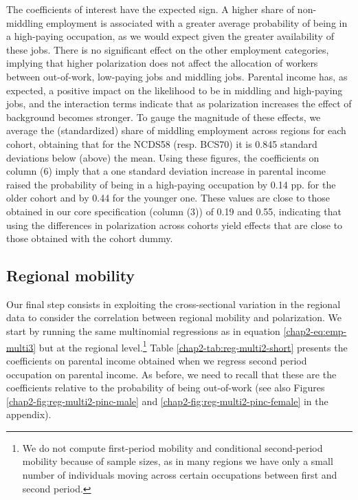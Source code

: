 The coefficients of interest have the expected sign. A higher share of non-middling employment is associated with a greater average probability of being in a high-paying occupation, as we would expect given the greater availability of these jobs. There is no significant effect on the other employment categories, implying that higher polarization does not affect the allocation of workers between out-of-work, low-paying jobs and middling jobs. Parental income has, as expected, a positive impact on the likelihood to be in middling and high-paying jobs, and the interaction terms indicate that as polarization increases the effect of background becomes stronger. To gauge the magnitude of these effects, we average the (standardized) share of middling employment across regions for each cohort, obtaining that for the NCDS58 (resp. BCS70) it is 0.845 standard deviations below (above) the mean. Using these figures, the coefficients on column (6) imply that a one standard deviation increase in parental income raised the probability of being in a high-paying occupation by 0.14 pp. for the older cohort and by 0.44 for the younger one. These values are close to those obtained in our core specification (column (3)) of 0.19 and 0.55, indicating that using the differences in polarization across cohorts yield effects that are close to those obtained with the cohort dummy. 


\subsection{Regional mobility} 

Our final step consists in exploiting the cross-sectional variation in the regional data to consider the correlation between regional mobility and polarization. We start by running the same multinomial regressions as in equation \ref{chap2-eq:emp-multi3} but at the regional level.\footnote{We do not compute first-period mobility and conditional second-period mobility because of sample sizes, as in many regions we have only a small number of individuals moving across certain occupations between first and second period.} Table \ref{chap2-tab:reg-multi2-short} presents the coefficients on parental income obtained when we regress second period occupation on parental income. As before, we need to recall that these are the coefficients relative to the probability of being out-of-work (see also Figures \ref{chap2-fig:reg-multi2-pinc-male} and \ref{chap2-fig:reg-multi2-pinc-female} in the appendix).

